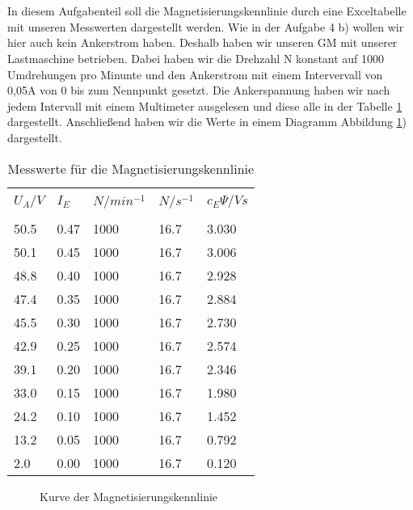 \section{}
In diesem Aufgabenteil soll die Magnetisierungskennlinie durch eine Exceltabelle mit unseren Messwerten dargestellt werden. Wie in der Aufgabe 4 b) wollen wir hier auch kein Ankerstrom haben. Deshalb haben wir unseren GM mit unserer Lastmaschine betrieben. Dabei haben wir die Drehzahl N konstant auf 1000 Umdrehungen pro Minunte und den Ankerstrom mit einem Intervervall von 0,05A von 0 bis zum Nennpunkt gesetzt. Die Ankerspannung haben wir nach jedem Intervall mit einem Multimeter ausgelesen und diese alle in der Tabelle \ref{tab:5c:cepsi} dargestellt. Anschließend haben wir die Werte in einem Diagramm Abbildung \ref{fig:5c:kennlinie}) dargestellt.  
\begin{table}[h]
	\centering
	\begin{tabular}{p{1.5cm} p{1.5cm} p{1.5cm} p{1.5cm} | p{1.5cm}}
		&&&&\\[-1em]
		$ U_{A}/V $ & $ I_{E} $ & $ N/min^{-1} $ & $ N/s^{-1} $ &  $ c_{E}\Psi/Vs $\\
		\hline &&&&\\[-1em]
		50.5 & 0.47 & 1000 & 16.7 & 3.030\\
		50.1 & 0.45 & 1000 & 16.7 & 3.006\\
		48.8 & 0.40 & 1000 & 16.7 & 2.928\\
		47.4 & 0.35 & 1000 & 16.7 & 2.884\\
		45.5 & 0.30 & 1000 & 16.7 & 2.730\\
		42.9 & 0.25 & 1000 & 16.7 & 2.574\\
		39.1 & 0.20 & 1000 & 16.7 & 2.346\\
		33.0 & 0.15 & 1000 & 16.7 & 1.980\\
		24.2 & 0.10 & 1000 & 16.7 & 1.452\\
		13.2 & 0.05 & 1000 & 16.7 & 0.792\\
		2.0 & 0.00 & 1000 & 16.7 & 0.120		
	\end{tabular}
	\caption{Messwerte für die Magnetisierungskennlinie }
	\label{tab:5c:cepsi}
\end{table}


\begin{figure}[h]
	\centering
	
	\caption{Kurve der Magnetisierungskennlinie}
	\label{fig:5c:kennlinie}
\end{figure}


